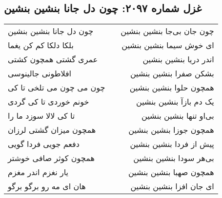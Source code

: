 \begin{center}
\section*{غزل شماره ۲۰۹۷: چون دل جانا بنشین بنشین}
\label{sec:2097}
\begin{longtable}{l p{0.5cm} r}
چون دل جانا بنشین بنشین
&&
چون جان بی‌جا بنشین بنشین
\\
بلکا دلکا کم کن یغما
&&
ای خوش سیما بنشین بنشین
\\
عمری گشتی همچون کشتی
&&
اندر دریا بنشین بنشین
\\
افلاطونی جالینوسی
&&
بشکن صفرا بنشین بنشین
\\
چون می چون می تلخی تا کی
&&
همچون حلوا بنشین بنشین
\\
خونم خوردی تا کی گردی
&&
یک دم بازآ بنشین بنشین
\\
تا کی لالا سوزد ما را
&&
بی‌او تنها بنشین بنشین
\\
همچون میزان گشتی لرزان
&&
همچون جوزا بنشین بنشین
\\
دفعم جویی فردا گویی
&&
پیش از فردا بنشین بنشین
\\
همچون کوثر صافی خوشتر
&&
بی‌هر سودا بنشین بنشین
\\
یار نغزم اندر مغزم
&&
همچون صهبا بنشین بنشین
\\
هان ای مه رو برگو برگو
&&
ای جان افزا بنشین بنشین
\\
\end{longtable}
\end{center}
